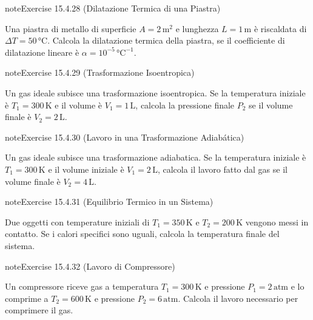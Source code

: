 \documentclass[letterpaper,10pt,italian]{jupyterBook}
\begin{document}
\begin{sphinxadmonition}{note}{Exercise 15.4.28 (Dilatazione Termica di una Piastra)}



\sphinxAtStartPar
Una piastra di metallo di superficie \(A = 2 \, \text{m}^2\) e lunghezza \(L = 1 \, \text{m}\) è riscaldata di \(\Delta T = 50 \, \text{°C}\). Calcola la dilatazione termica della piastra, se il coefficiente di dilatazione lineare è \( \alpha = 10^{-5} \, \text{°C}^{-1}\).
\end{sphinxadmonition}
 \label{exercise:ch/thermodynamics/matter-problems-exercise-28}

\begin{sphinxadmonition}{note}{Exercise 15.4.29 (Trasformazione Isoentropica)}



\sphinxAtStartPar
Un gas ideale subisce una trasformazione isoentropica. Se la temperatura iniziale è \(T_1 = 300 \, \text{K}\) e il volume è \(V_1 = 1 \, \text{L}\), calcola la pressione finale \(P_2\) se il volume finale è \(V_2 = 2 \, \text{L}\).
\end{sphinxadmonition}
 \label{exercise:ch/thermodynamics/matter-problems-exercise-29}

\begin{sphinxadmonition}{note}{Exercise 15.4.30 (Lavoro in una Trasformazione Adiabática)}



\sphinxAtStartPar
Un gas ideale subisce una trasformazione adiabatica. Se la temperatura iniziale è \(T_1 = 300 \, \text{K}\) e il volume iniziale è \(V_1 = 2 \, \text{L}\), calcola il lavoro fatto dal gas se il volume finale è \(V_2 = 4 \, \text{L}\).
\end{sphinxadmonition}
 \label{exercise:ch/thermodynamics/matter-problems-exercise-30}

\begin{sphinxadmonition}{note}{Exercise 15.4.31 (Equilibrio Termico in un Sistema)}



\sphinxAtStartPar
Due oggetti con temperature iniziali di \(T_1 = 350 \, \text{K}\) e \(T_2 = 200 \, \text{K}\) vengono messi in contatto. Se i calori specifici sono uguali, calcola la temperatura finale del sistema.
\end{sphinxadmonition}
 \label{exercise:ch/thermodynamics/matter-problems-exercise-31}

\begin{sphinxadmonition}{note}{Exercise 15.4.32 (Lavoro di Compressore)}



\sphinxAtStartPar
Un compressore riceve gas a temperatura \(T_1 = 300 \, \text{K}\) e pressione \(P_1 = 2 \, \text{atm}\) e lo comprime a \(T_2 = 600 \, \text{K}\) e pressione \(P_2 = 6 \, \text{atm}\). Calcola il lavoro necessario per comprimere il gas.
\end{sphinxadmonition}
\end{document}
